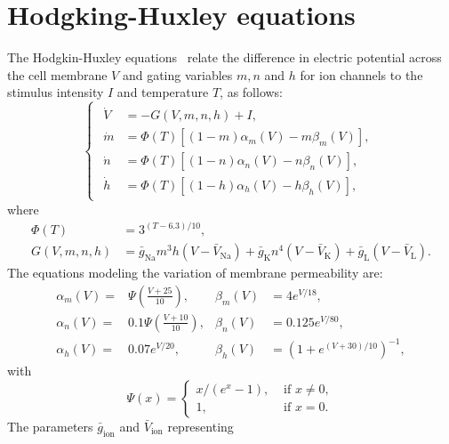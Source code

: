 \section{Hodgking-Huxley equations}
\label{sec:Hodgking-Huxley}
The Hodgkin-Huxley equations~\cite{HodgkinHuxley1952} relate the difference in electric
potential across the cell membrane $V$ and gating variables $m, n$ and $h$
for ion channels to the stimulus intensity $I$ and temperature $T$, as
follows:
\begin{equation}
\label{eq:HodgkinHuxleyEquations}
\begin{cases}
\begin{aligned}
    \dot{V} &= -G(V, m, n, h)+I, \\
    \dot{m} &= \Phi(T)\left[(1-m) \alpha_{m}(V)-m \beta_{m}(V)\right], \\
    \dot{n} &= \Phi(T)\left[(1-n) \alpha_{n}(V)-n \beta_{n}(V)\right], \\
    \dot{h} &= \Phi(T)\left[(1-h) \alpha_{h}(V)-h \beta_{h}(V)\right],
\end{aligned}
\end{cases}
\end{equation}
where 
\begin{align*}
    \Phi(T) & = 3^{({T}-6.3) / 10}, \\
    G(V, m, n, h) & =\bar{g}_{\mathrm{Na}} m^{3}
    h\left(V-\bar{V}_{\mathrm{Na}}\right)+\bar{g}_{\mathrm{K}}
    n^{4}\left(V-\bar{V}_{\mathrm{K}}\right)+\bar{g}_{\mathrm{L}}\left(V-\bar{V}_{\mathrm{L}}\right).
\end{align*}
The equations modeling the variation of membrane permeability are:
\begin{align*}
    \alpha_{m}(V) =& \Psi\left(\frac{V+25}{10}\right), & \beta_{m}(V) &= 4 e^{V / 18}, \\
    \alpha_{n}(V) =& 0.1 \Psi\left(\frac{V+10}{10}\right), & \beta_{n}(V) &= 0.125 e^{V / 80}, \\
    \alpha_{h}(V) =& 0.07 e^{V / 20}, & \beta_{h}(V) &= \left(1+e^{(V+30) / 10}\right)^{-1},
\end{align*} with
\begin{equation*}
    \Psi(x) = \begin{cases}
        x /\left(e^{x}-1\right), & \text { if } x \neq 0, \\
        1, & \text { if } x=0.
    \end{cases}
\end{equation*}
The parameters $\bar{g}_{\text{ion}}$ and $\bar{V}_{\text{ion}}$ representing
